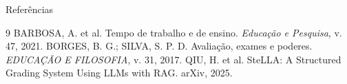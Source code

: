 \documentclass[10pt,aspectratio=169]{beamer}
\begin{document}
\begin{frame}[allowframebreaks]{Referências}
  \small
  \begin{thebibliography}{9}
     BARBOSA, A. et al. Tempo de trabalho e de ensino. \textit{Educação e Pesquisa}, v. 47, 2021.
     BORGES, B. G.; SILVA, S. P. D. Avaliação, exames e poderes. \textit{EDUCAÇÃO E FILOSOFIA}, v. 31, 2017.
     QIU, H. et al. SteLLA: A Structured Grading System Using LLMs with RAG. arXiv, 2025.
  \end{thebibliography}
\end{frame}
\end{document}
